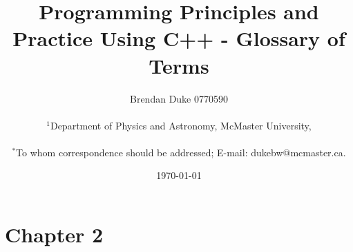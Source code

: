 \documentclass[12pt]{article}
\title{Programming Principles and Practice Using C++ - Glossary of Terms}
\author
{Brendan Duke 0770590\\
\\
\normalsize{$^{1}$Department of Physics and Astronomy, McMaster University,}\\
\\
\normalsize{$^\ast$To whom correspondence should be addressed; E-mail:  dukebw@mcmaster.ca.}
}
\date{\today}
\begin{document}
 


\baselineskip16pt


\maketitle 









\section*{Chapter 2}
\end{document}
